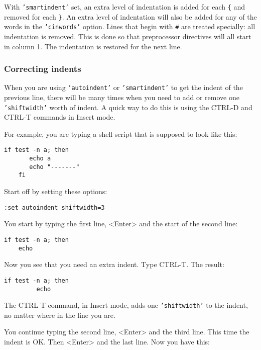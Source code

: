 With \texttt{'smartindent'} set, an extra level of indentation is added for each \texttt{\{} and removed for each \texttt{\}}.
An extra level of indentation will also be added for any of the words in the \texttt{'cinwords'} option.
Lines that begin with \texttt{\#} are treated specially: all indentation is removed.
This is done so that preprocessor directives will all start in column 1.
The indentation is restored for the next line.

\subsubsection{Correcting indents}
When you are using \texttt{'autoindent'} or \texttt{'smartindent'} to get the indent of the previous line, there will be many times when you need to add or remove one \texttt{'shiftwidth'} worth of indent.
A quick way to do this is using the CTRL-D and CTRL-T commands in Insert mode.

For example, you are typing a shell script that is supposed to look like this:

\begin{Verbatim}[samepage=true]
    if test -n a; then
       echo a
       echo "-------"
    fi
\end{Verbatim}

Start off by setting these options:

\begin{Verbatim}[samepage=true]
 :set autoindent shiftwidth=3
\end{Verbatim}

You start by typing the first line, <Enter> and the start of the second line:

\begin{Verbatim}[samepage=true]
    if test -n a; then
    echo
\end{Verbatim}

Now you see that you need an extra indent.
Type CTRL-T.
The result:

\begin{Verbatim}[samepage=true]
    if test -n a; then
         echo
\end{Verbatim}

The CTRL-T command, in Insert mode, adds one \texttt{'shiftwidth'} to the indent, no matter where in the line you are.

You continue typing the second line, <Enter> and the third line.
This time the indent is OK.
Then <Enter> and the last line.
Now you have this:

